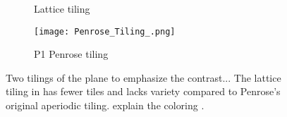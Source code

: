 


\begin{figure}[h!]%
    \centering
    \begin{subfigure}{.47\textwidth}
        \centering
        \caption{Lattice tiling}
        \label{fig:tiling_one}
    \end{subfigure}\quad
    \begin{subfigure}{.47\textwidth}
        \centering
        \texttt{[image: Penrose\_Tiling\_.png]}
        \caption{P1 Penrose tiling}
        \label{fig:tiling_two}
    \end{subfigure}
    \caption{Two tilings of the plane to emphasize the contrast... The lattice tiling in  has fewer tiles and lacks variety compared to Penrose's original aperiodic tiling. explain the coloring \cite{inductiveloadP1TilingUsing}.}
    \label{fig:tilings_one_two}
\end{figure}
